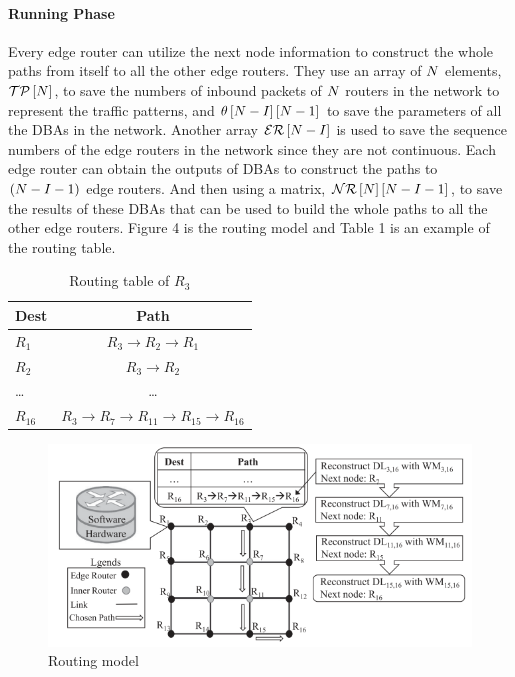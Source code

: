 \documentclass[11pt]{report}
\begin{document}
	\paragraph{Running Phase}
	Every edge router can utilize the next node information to construct the whole paths from itself to all the other edge routers. They use an array of $\mathnormal{N}$ elements, $\mathcal{TP}\left[\mathnormal{N}\right]$, to save the numbers of inbound packets of $\mathnormal{N}$ routers in the network to represent the traffic patterns, and $\theta\left[\mathnormal{N} - \mathnormal{I}\right]\left[\mathnormal{N} - 1\right]$ to save the parameters of all the DBAs in the network. Another array $\mathcal{ER}\left[\mathnormal{N} - \mathnormal{I}\right]$ is used to save the sequence numbers of the edge routers in the network since they are not continuous. Each edge router can obtain the outputs of DBAs to construct the paths to $\left(\mathnormal{N} - \mathnormal{I} - 1\right)$ edge routers. And then using a matrix, $\mathcal{NR}\left[\mathnormal{N}\right]\left[\mathnormal{N} - \mathnormal{I} - 1\right]$, to save the results of these DBAs that can be used to build the whole paths to all the other edge routers. Figure 4 is the routing model and Table 1 is an example of the routing table.\\

	\begin{table}[!h]
		\centering
		\caption{Routing table of $R_3$}
		\begin{tabular}{lc}
			\toprule
			Dest& Path\\
			\hline
			$R_1$& $R_3 \to R_2 \to R_1$\\
			$R_2$& $R_3 \to R_2$\\
			\dots& \dots\\
			$R_{16}$& $R_3 \to R_7 \to R_{11} \to R_{15} \to R_{16}$\\
			\hline
		\end{tabular}
	\end{table}

	\begin{figure}[h!]
		\centering
		\includegraphics[width=0.5\linewidth]{figure4.png}
		\caption{Routing model}
		\label{fig-label}
	\end{figure}
\end{document}
